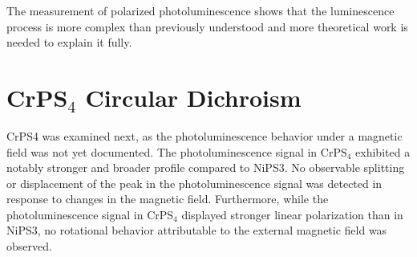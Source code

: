 \documentclass[
	oneside,
	parskip=half,
	a4paper,
]{scrbook}
\begin{document}
The measurement of polarized photoluminescence shows that the luminescence process is more complex than previously understood and more theoretical work is needed to explain it fully.

\clearpage

\section{CrPS$_4$ Circular Dichroism}
CrPS4 was examined next, as the photoluminescence behavior under a magnetic field was not yet documented.
The photoluminescence signal in CrPS$_4$ exhibited a notably stronger and broader profile compared to NiPS3.
No observable splitting or displacement of the peak in the photoluminescence signal was detected in response to changes in the magnetic field. 
Furthermore, while the photoluminescence signal in CrPS$_4$ displayed stronger linear polarization than in NiPS3, no rotational behavior attributable to the external magnetic field was observed.
\end{document}
